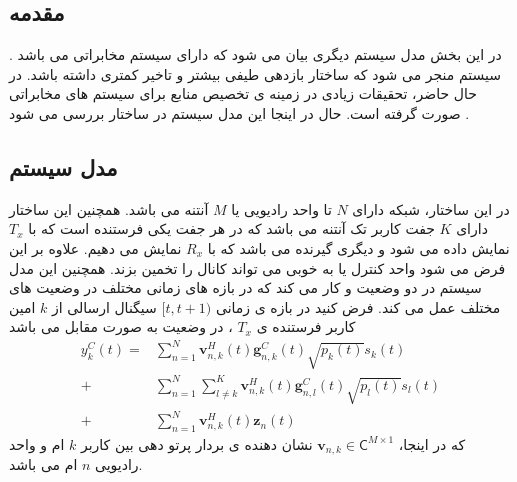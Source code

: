 \subsection{مقدمه}
در این بخش مدل سیستم دیگری بیان می شود که دارای سیستم مخابراتی  
 می باشد \cite{d2d, d2dd} . سیستم  منجر می شود که ساختار  بازدهی طیفی بیشتر و تاخیر کمتری داشته باشد. در حال حاضر، تحقیقات زیادی در زمینه ی تخصیص منابع برای سیستم های مخابراتی  صورت گرفته است.
 حال در اینجا این مدل سیستم در ساختار  بررسی می شود \cite{rd2d}.
 \subsection{مدل سیستم}
  در این ساختار، شبکه دارای $N$ تا واحد رادیویی یا  $M$ آنتنه می باشد. همچنین این ساختار دارای $K$ جفت کاربر  تک آنتنه می باشد که در هر جفت یکی فرستنده است که با $T_x$ نمایش داده می شود و دیگری گیرنده می باشد که با $R_x$ نمایش می دهیم. 
علاوه بر این فرض می شود واحد کنترل یا  به خوبی می تواند کانال را تخمین بزند. 
همچنین این مدل سیستم در دو وضعیت  و  کار می کند که در بازه های زمانی مختلف در وضعیت های مختلف عمل می کند. 
فرض کنید در بازه ی زمانی  
$[t,t+1)$
سیگنال ارسالی از $k$ امین کاربر فرستنده ی  
$T_x$
، در وضعیت  به صورت مقابل می باشد
\begin{equation}
\begin{split}
y^C_k(t) =& \sum_{n=1}^{N} \boldsymbol{v}_{n,k}^{H}(t) \boldsymbol{g}_{n,k}^{C}(t) \sqrt{p_k(t)} s_k(t) \\
+& \sum_{n=1}^{N} \sum_{l\neq k}^{K} \boldsymbol{v}_{n,k}^{H}(t) \boldsymbol{g}_{n,l}^{C}(t) \sqrt{p_l(t)} s_l(t) \\
+& \sum_{n=1}^{N} \boldsymbol{v}_{n,k}^{H}(t) \boldsymbol{z}_n(t)
\end{split}
\end{equation}
 که در اینجا، $\boldsymbol{v}_{n,k} \in \mathsf{C}^{M\times 1}$
  نشان دهنده ی بردار پرتو دهی بین
 کاربر $k$ ام  و  واحد رادیویی $n$ ام می باشد.

